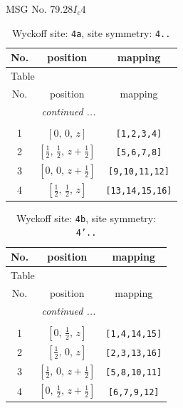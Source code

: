 \documentclass[fleqn,8pt]{jsarticle}
\begin{document}
\setcounter{MaxMatrixCols}{32}

\renewcommand{\tablename}{Table~}
\renewcommand{\figurename}{Figure~}
\begin{center}
\LARGE
MSG No. 79.28\quad$I_{c}4$
\end{center}
\renewcommand{\arraystretch}{1.2}
\begin{longtable}{ccc}
\caption{Wyckoff site: {\tt 4a}, site symmetry: {\tt 4..}}
 \\
 \hline \hline
No. & position & mapping \\ \hline \endfirsthead

\multicolumn{2}{l}{\tablename\ \thetable{}} \\
 \hline \hline
No. & position & mapping \\ \hline \endhead

 \hline \hline
\multicolumn{2}{r}{\footnotesize\it continued ...} \\ \endfoot

 \hline \hline
\multicolumn{2}{r}{} \\ \endlastfoot

1 & $\left[ 0,\, 0,\, z \right]$ & {\tt [1,2,3,4]} \\ \hline
2 & $\left[ \frac{1}{2},\, \frac{1}{2},\, z + \frac{1}{2} \right]$ & {\tt [5,6,7,8]} \\ \hline
3 & $\left[ 0,\, 0,\, z + \frac{1}{2} \right]$ & {\tt [9,10,11,12]} \\ \hline
4 & $\left[ \frac{1}{2},\, \frac{1}{2},\, z \right]$ & {\tt [13,14,15,16]} \\
\end{longtable}
\renewcommand{\arraystretch}{1.2}
\begin{longtable}{ccc}
\caption{Wyckoff site: {\tt 4b}, site symmetry: {\tt 4'..}}
 \\
 \hline \hline
No. & position & mapping \\ \hline \endfirsthead

\multicolumn{2}{l}{\tablename\ \thetable{}} \\
 \hline \hline
No. & position & mapping \\ \hline \endhead

 \hline \hline
\multicolumn{2}{r}{\footnotesize\it continued ...} \\ \endfoot

 \hline \hline
\multicolumn{2}{r}{} \\ \endlastfoot

1 & $\left[ 0,\, \frac{1}{2},\, z \right]$ & {\tt [1,4,14,15]} \\ \hline
2 & $\left[ \frac{1}{2},\, 0,\, z \right]$ & {\tt [2,3,13,16]} \\ \hline
3 & $\left[ \frac{1}{2},\, 0,\, z + \frac{1}{2} \right]$ & {\tt [5,8,10,11]} \\ \hline
4 & $\left[ 0,\, \frac{1}{2},\, z + \frac{1}{2} \right]$ & {\tt [6,7,9,12]} \\
\end{longtable}
\end{document}
